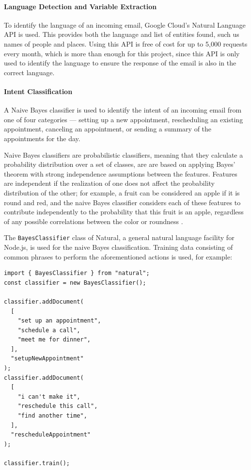 \documentclass{article}
\begin{document}
\paragraph{Language Detection and Variable Extraction}

To identify the language of an incoming email, Google Cloud's Natural Language API is used. This provides both the language and list of entities found, such us names of people and places. Using this API is free of cost for up to 5,000 requests every month, which is more than enough for this project, since this API is only used to identify the language to ensure the response of the email is also in the correct language.

\paragraph{Intent Classification}

A Naive Bayes classifier is used to identify the intent of an incoming email from one of four categories --- setting up a new appointment, rescheduling an existing appointment, canceling an appointment, or sending a summary of the appointments for the day.

Naive Bayes classifiers are probabilistic classifiers, meaning that they calculate a probability distribution over a set of classes, are are based on applying Bayes' theorem with strong independence assumptions between the features. Features are independent if the realization of one does not affect the probability distribution of the other; for example, a fruit can be considered an apple if it is round and red, and the naive Bayes classifier considers each of these features to contribute independently to the probability that this fruit is an apple, regardless of any possible correlations between the color or roundness \cite{noauthor_lecture_nodate}.

The \texttt{BayesClassifier} class of Natural, a general natural language facility for Node.js, is used for the naive Bayes classification. Training data consisting of common phrases to perform the aforementioned actions is used, for example:

\begin{verbatim}
import { BayesClassifier } from "natural";
const classifier = new BayesClassifier();

classifier.addDocument(
  [
    "set up an appointment",
    "schedule a call",
    "meet me for dinner",
  ],
  "setupNewAppointment"
);
classifier.addDocument(
  [
    "i can't make it",
    "reschedule this call",
    "find another time",
  ],
  "rescheduleAppointment"
);

classifier.train();
\end{verbatim}
\end{document}
